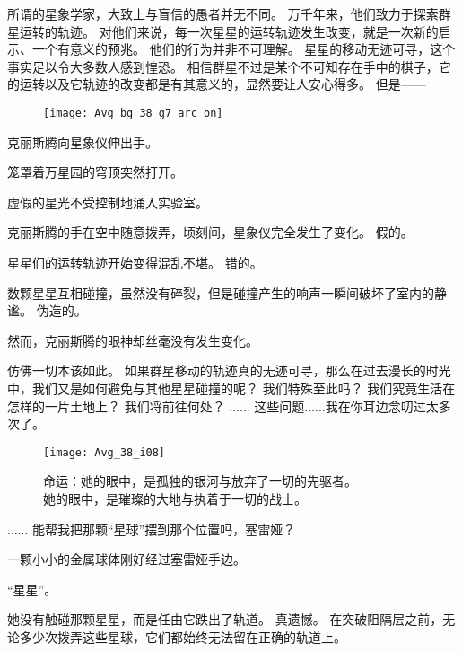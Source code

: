\documentclass[openany]{book}
\begin{document}
\begin{dialogue}
     所谓的星象学家，大致上与盲信的愚者并无不同。
     万千年来，他们致力于探索群星运转的轨迹。
     对他们来说，每一次星星的运转轨迹发生改变，就是一次新的启示、一个有意义的预兆。
     他们的行为并非不可理解。
     星星的移动无迹可寻，这个事实足以令大多数人感到惶恐。
     相信群星不过是某个不可知存在手中的棋子，它的运转以及它轨迹的改变都是有其意义的，显然要让人安心得多。
     但是——\par
    \begin{figure}[h]
        \centering
        \texttt{[image: Avg\_bg\_38\_g7\_arc\_on]}
    \end{figure}
    克丽斯腾向星象仪伸出手。\par
    笼罩着万星园的穹顶突然打开。\par
    虚假的星光不受控制地涌入实验室。\par
    克丽斯腾的手在空中随意拨弄，顷刻间，星象仪完全发生了变化。
     假的。\par
    星星们的运转轨迹开始变得混乱不堪。
     错的。\par
    数颗星星互相碰撞，虽然没有碎裂，但是碰撞产生的响声一瞬间破坏了室内的静谧。
     伪造的。\par
    然而，克丽斯腾的眼神却丝毫没有发生变化。\par
    仿佛一切本该如此。
     如果群星移动的轨迹真的无迹可寻，那么在过去漫长的时光中，我们又是如何避免与其他星星碰撞的呢？
     我们特殊至此吗？
     我们究竟生活在怎样的一片土地上？
     我们将前往何处？
     ......
     这些问题......我在你耳边念叨过太多次了。
    \begin{figure}[h]
        \caption*{命运：她的眼中，是孤独的银河与放弃了一切的先驱者。\\她的眼中，是璀璨的大地与执着于一切的战士。}
        \centering
        \texttt{[image: Avg\_38\_i08]}
    \end{figure}
     ......
     能帮我把那颗“星球”摆到那个位置吗，塞雷娅？\par
    一颗小小的金属球体刚好经过塞雷娅手边。\par
    “星星”。\par
    她没有触碰那颗星星，而是任由它跌出了轨道。
     真遗憾。
     在突破阻隔层之前，无论多少次拨弄这些星球，它们都始终无法留在正确的轨道上。

\end{dialogue}
\end{document}
